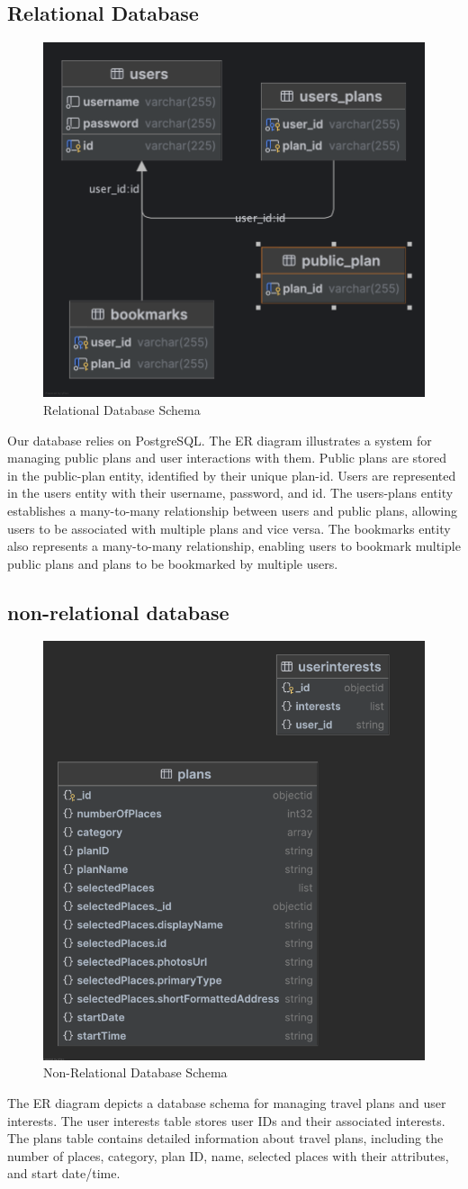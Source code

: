 \subsection{Relational Database}
\begin{figure}[!h]
	\centering
	\includegraphics[width=0.5\linewidth]{chapter3/relational-database.png}
	\caption{Relational Database Schema}
	\label{fig:Relational Database Schema}
\end{figure}
Our database relies on PostgreSQL. The ER diagram illustrates a system for managing public
plans and user interactions with them. Public plans are stored in the public-plan entity, identified
by their unique plan-id. Users are represented in the users entity with their username, password,
and id. The users-plans entity establishes a many-to-many relationship between users and public
plans, allowing users to be associated with multiple plans and vice versa. The bookmarks entity
also represents a many-to-many relationship, enabling users to bookmark multiple public plans
and plans to be bookmarked by multiple users.
\newpage
\subsection{non-relational database}
\begin{figure}[!h]
    \centering
    \includegraphics[width=0.6\linewidth]{chapter3/no-sql-diagram.png}
    \caption{Non-Relational Database Schema}
    \label{fig:Non-Relational Database Schema}
\end{figure}
The ER diagram depicts a database schema for managing travel plans and user interests. The
user interests table stores user IDs and their associated interests. The plans table contains detailed
information about travel plans, including the number of places, category, plan ID, name, selected
places with their attributes, and start date/time.